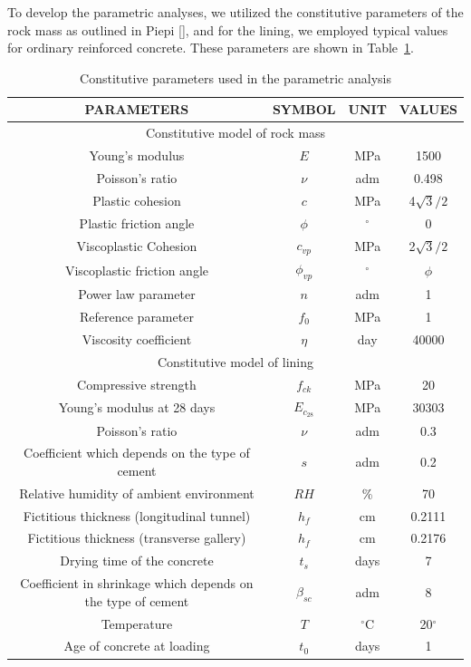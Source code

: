 \documentclass[a4paper,fleqn]{cas-sc}
\begin{document}
To develop the parametric analyses, we utilized the constitutive parameters of the rock mass as outlined in Piepi [], and for the lining, we employed typical values for ordinary reinforced concrete. These parameters are shown in Table~\ref{table2}.
\begin{table}
	\caption{Constitutive parameters used in the parametric analysis}
	\label{table2}
	\centering
	\renewcommand{\arraystretch}{1.25}
	\begin{tabular}{c c c c}
		\hline
		\multicolumn{1}{c}{PARAMETERS} &
		\multicolumn{1}{c}{SYMBOL} &
		\multicolumn{1}{c}{UNIT} &
		\multicolumn{1}{c}{VALUES} \\
		\hline
		\multicolumn{4}{c}{Constitutive model of rock mass} \\
		\hline
		Young's modulus & $E$ & MPa & 1500 \\
		Poisson's ratio & $\nu$ & adm & 0.498 \\
		Plastic cohesion & $c$ & MPa & 4$\sqrt{3}/2$ \\
		Plastic friction angle & $\phi$ & $^{\circ}$ & 0 \\
		Viscoplastic Cohesion & $c_{vp}$ & MPa & 2$\sqrt{3}/2$ \\
		Viscoplastic friction angle & $\phi_{vp}$ & $^{\circ}$ & $\phi$ \\
		Power law parameter & $n$ & adm & 1 \\
		Reference parameter & $f_0$ & MPa & 1 \\
		Viscosity coefficient & $\eta$ & day & 40000 \\
		\hline
		\multicolumn{4}{c}{Constitutive model of lining} \\
		\hline
		
		Compressive strength & $f_{ck}$ & MPa & 20 \\
		Young's modulus at 28 days & $E_{c_{28}}$ & MPa & $30303$ \\
		Poisson's ratio & $\nu$ & adm & 0.3 \\
		
		Coefficient which depends on the type of cement & $s$ & adm & 0.2 \\
		Relative humidity of ambient environment & $RH$ & \% & 70 \\
		Fictitious thickness (longitudinal tunnel) & $h_f$ & cm & 0.2111 \\
		Fictitious thickness (transverse gallery) & $h_f$ & cm & 0.2176 \\
		Drying time of the concrete & $t_s$ & days & 7 \\
		Coefficient in shrinkage which depends on the type of cement & $\beta_{sc}$ & adm & 8 \\
		Temperature & $T$ & $^\circ$C & 20$^\circ$ \\
		Age of concrete at loading & $t_0$ & days & 1 \\
		\hline
	\end{tabular}
	\normalsize
\end{table}
\end{document}
